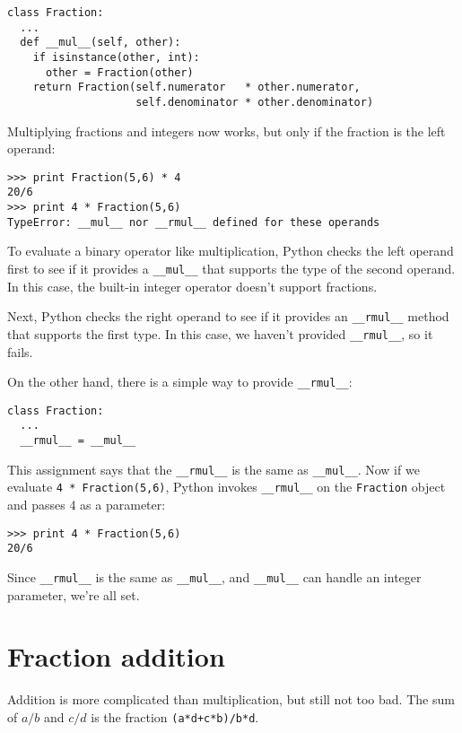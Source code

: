 \beforeverb
\begin{verbatim}
class Fraction:
  ...
  def __mul__(self, other):
    if isinstance(other, int):
      other = Fraction(other)
    return Fraction(self.numerator   * other.numerator,
                    self.denominator * other.denominator)
\end{verbatim}
\afterverb
%
Multiplying fractions and integers now works, but only if the fraction
is the left operand:

\beforeverb
\begin{verbatim}
>>> print Fraction(5,6) * 4
20/6
>>> print 4 * Fraction(5,6)
TypeError: __mul__ nor __rmul__ defined for these operands
\end{verbatim}
\afterverb
%
To evaluate a binary operator like multiplication, Python checks
the left operand first to see if it provides a {\tt \_\_mul\_\_}
that supports the type of the second operand.  In this case,
the built-in integer operator doesn't support fractions.

Next, Python checks the right operand to see if it provides
an {\tt \_\_rmul\_\_} method that supports the first type.  In
this case, we haven't provided {\tt \_\_rmul\_\_}, so it fails.

On the other hand, there is a simple way to provide
{\tt \_\_rmul\_\_}:

\beforeverb
\begin{verbatim}
class Fraction:
  ...
  __rmul__ = __mul__
\end{verbatim}
\afterverb
%
This assignment says that the {\tt \_\_rmul\_\_} is the same
as {\tt \_\_mul\_\_}.
Now if we evaluate {\tt 4 * Fraction(5,6)}, Python invokes
{\tt \_\_rmul\_\_} on the {\tt Fraction} object and passes 4
as a parameter:

\beforeverb
\begin{verbatim}
>>> print 4 * Fraction(5,6)
20/6
\end{verbatim}
\afterverb
%
Since {\tt \_\_rmul\_\_} is the same as {\tt \_\_mul\_\_}, and
{\tt \_\_mul\_\_} can handle an integer parameter, we're all set.


\section{Fraction addition}

Addition is more complicated than multiplication, but still not too
bad.  The sum of $a/b$ and $c/d$ is the fraction
{\tt (a*d+c*b)/b*d}.

